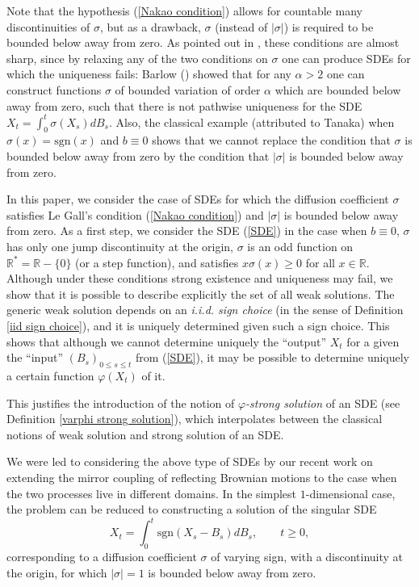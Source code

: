 \documentclass[reqno]{amsart}
\theoremstyle{definition}
\theoremstyle{remark}
\numberwithin{equation}{section}
\begin{document}
Note that the hypothesis (\ref{Nakao condition}) allows for countable many discontinuities of $\sigma $, but as a drawback, $\sigma $ (instead of $\left\vert \sigma \right\vert $) is required to be bounded below away from
zero. As pointed out in \cite{Le Gall}, these conditions are almost sharp,
since by relaxing any of the two conditions on $\sigma $ one can produce
SDEs for which the uniqueness fails: Barlow (\cite{Barlow}) showed that for
any $\alpha >2$ one can construct functions $\sigma $ of bounded variation
of order $\alpha $ which are bounded below away from zero, such that there
is not pathwise uniqueness for the SDE $X_{t}=\int_{0}^{t}\sigma \left(
X_{s}\right) dB_{s}$. Also, the classical example (attributed to Tanaka)
when $\sigma \left( x\right) =\mathrm{sgn}\left( x\right) $ and $b\equiv 0$
shows that we cannot replace the condition that $\sigma $ is bounded below
away from zero by the condition that $\left\vert \sigma \right\vert $ is
bounded below away from zero.

In this paper, we consider the case of SDEs for which the diffusion
coefficient $\sigma $ satisfies Le Gall's condition (\ref{Nakao condition})
and $\left\vert \sigma \right\vert $ is bounded below away from zero. As a
first step, we consider the SDE (\ref{SDE}) in the case when $b\equiv 0$, $\sigma $ has only one jump discontinuity at the origin, $\sigma$ is an odd function on $\mathbb{R}^\ast=\mathbb{R}-\{0\}$ (or a step function), and satisfies $x\sigma
\left( x\right) \geq 0$ for all $x\in \mathbb{R}$. Although under these
conditions strong existence and uniqueness may fail, we show that it is
possible to describe explicitly the set of all weak solutions. The generic
weak solution depends on an \emph{i.i.d. sign choice} (in the sense of
Definition \ref{iid sign choice}), and it is uniquely determined given such a
sign choice. This shows that although we cannot determine uniquely the
``output'' $X_t$ for a given the ``input'' $\left(B_s\right)_{0\le s\le t}$ from (\ref{SDE}), it may
be possible to determine uniquely a certain function $\varphi \left(X_t\right)$ of it.

This justifies the introduction of the notion of $\varphi $\emph{-strong solution }of an SDE (see Definition \ref{varphi strong solution}), which interpolates between the classical notions of weak solution and strong solution of an SDE.

We were led to considering the above type of SDEs by our recent work on
extending the mirror coupling of reflecting Brownian motions to the case
when the two processes live in different domains. In the simplest $1$-dimensional case, the problem can be reduced to constructing a solution of
the singular SDE\begin{equation}
X_{t}=\int_{0}^{t}\mathrm{sgn}\left( X_{s}-B_{s}\right) dB_{s},\qquad t\geq 0,
\end{equation}corresponding to a diffusion coefficient $\sigma $ of varying sign, with a
discontinuity at the origin, for which $\left\vert \sigma \right\vert =1$ is
bounded below away from zero.
\end{document}
